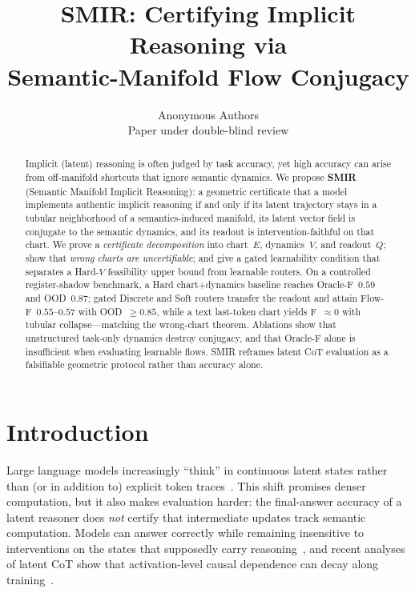 \documentclass[letterpaper,10pt,twocolumn]{article}
\title{\bf SMIR: Certifying Implicit Reasoning via\\
Semantic-Manifold Flow Conjugacy}
\author{
Anonymous Authors\\
Paper under double-blind review
}
\date{}
\theoremstyle{definition}
\begin{document}
\maketitle

\begin{abstract}
Implicit (latent) reasoning is often judged by task accuracy, yet high accuracy can arise from off-manifold shortcuts that ignore semantic dynamics.
We propose \textbf{SMIR} (Semantic Manifold Implicit Reasoning): a geometric certificate that a model implements authentic implicit reasoning if and only if its latent trajectory stays in a tubular neighborhood of a semantics-induced manifold, its latent vector field is conjugate to the semantic dynamics, and its readout is intervention-faithful on that chart.
We prove a \emph{certificate decomposition} into chart~$E$, dynamics~$V$, and readout~$Q$; show that \emph{wrong charts are uncertifiable}; and give a gated learnability condition that separates a Hard-$V$ feasibility upper bound from learnable routers.
On a controlled register-shadow benchmark, a Hard chart+dynamics baseline reaches Oracle-F~$0.59$ and OOD~$0.87$; gated Discrete and Soft routers transfer the readout and attain Flow-F~$0.55$--$0.57$ with OOD~$\ge 0.85$, while a text last-token chart yields F~$\approx 0$ with tubular collapse---matching the wrong-chart theorem.
Ablations show that unstructured task-only dynamics destroy conjugacy, and that Oracle-F alone is insufficient when evaluating learnable flows.
SMIR reframes latent CoT evaluation as a falsifiable geometric protocol rather than accuracy alone.
\end{abstract}

\section{Introduction}
\label{sec:intro}

Large language models increasingly ``think'' in continuous latent states rather than (or in addition to) explicit token traces~\citep{hao2024coconut,zhu2025codi}.
This shift promises denser computation, but it also makes evaluation harder: the final-answer accuracy of a latent reasoner does \emph{not} certify that intermediate updates track semantic computation.
Models can answer correctly while remaining insensitive to interventions on the states that supposedly carry reasoning~\citep{turpin2023faithfulness,lanham2023measuring}, and recent analyses of latent CoT show that activation-level causal dependence can decay along training~\citep{faithful2025latent}.
\end{document}
